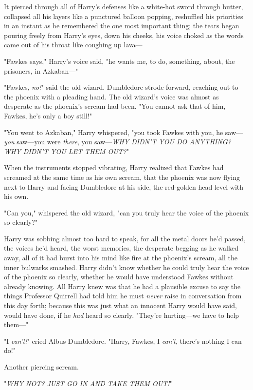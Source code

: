It pierced through all of Harry's defenses like a white-hot sword through 
butter, collapsed all his layers like a punctured balloon popping, reshuffled 
his priorities in an instant as he remembered the one most important thing; the 
tears began pouring freely from Harry's eyes, down his cheeks, his voice choked 
as the words came out of his throat like coughing up lava---

"Fawkes says," Harry's voice said, "he wants me, to do, something, about, the 
prisoners, in Azkaban---"

"Fawkes, \emph{no!}" said the old wizard. Dumbledore strode forward, reaching 
out to the phoenix with a pleading hand. The old wizard's voice was almost as 
desperate as the phoenix's scream had been. "You cannot ask that of him, 
Fawkes, he's only a boy still!"

"You went to Azkaban," Harry whispered, "you took Fawkes with you, he 
saw---\emph{you} saw---you were \emph{there}, you saw---\emph{WHY DIDN'T YOU DO 
ANYTHING? WHY DIDN'T YOU LET THEM OUT?}"

When the instruments stopped vibrating, Harry realized that Fawkes had screamed 
at the same time as his own scream, that the phoenix was now flying next to 
Harry and facing Dumbledore at his side, the red-golden head level with his own.

"Can you," whispered the old wizard, "can you truly hear the voice of the 
phoenix so clearly?"

Harry was sobbing almost too hard to speak, for all the metal doors he'd 
passed, the voices he'd heard, the worst memories, the desperate begging as he 
walked away, all of it had burst into his mind like fire at the phoenix's 
scream, all the inner bulwarks smashed. Harry didn't know whether he could 
truly hear the voice of the phoenix so clearly, whether he would have 
understood Fawkes without already knowing. All Harry knew was that he had a 
plausible excuse to say the things Professor Quirrell had told him he must 
\emph{never} raise in conversation from this day forth; because this was just 
what an innocent Harry would have said, would have done, if he \emph{had} heard 
so clearly. "They're hurting---we have to help them---"

"I \emph{can't!}" cried Albus Dumbledore. "Harry, Fawkes, I \emph{can't}, 
there's nothing I can do!"

Another piercing scream.

"\emph{WHY NOT? JUST GO IN AND TAKE THEM OUT!}"


